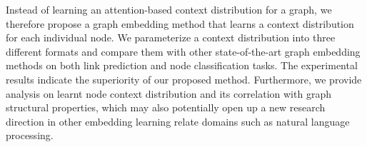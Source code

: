 \documentclass{article}
\begin{document}
Instead of learning an attention-based context distribution for a graph, we therefore propose a graph embedding method that learns a context distribution for each individual node. We parameterize a context distribution into three different formats and compare them with other state-of-the-art graph embedding methods on both link prediction and node classification tasks. The experimental results indicate the superiority of our proposed method. Furthermore, we provide analysis on learnt node context distribution and its correlation with graph structural properties, which may also potentially open up a new research direction in other embedding learning relate domains such as natural language processing. 






\end{document}
